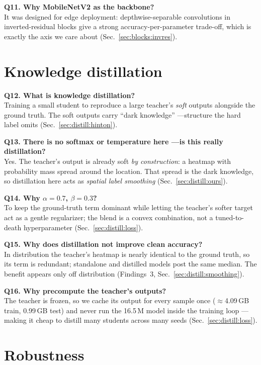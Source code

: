 \textbf{Q11. Why MobileNetV2 as the backbone?}\\
It was designed for edge deployment: depthwise-separable convolutions in inverted-residual blocks give
a strong accuracy-per-parameter trade-off, which is exactly the axis we care about
(Sec.~\ref{sec:blocks:invres}).

\section{Knowledge distillation}
\label{sec:qa:kd}

\textbf{Q12. What is knowledge distillation?}\\
Training a small student to reproduce a large teacher's \emph{soft} outputs alongside the ground truth.
The soft outputs carry ``dark knowledge'' ---structure the hard label omits (Sec.~\ref{sec:distill:hinton}).

\textbf{Q13. There is no softmax or temperature here ---is this really distillation?}\\
Yes. The teacher's output is already soft \emph{by construction}: a heatmap with probability mass
spread around the location. That spread is the dark knowledge, so distillation here acts as
\emph{spatial label smoothing} (Sec.~\ref{sec:distill:ours}).

\textbf{Q14. Why $\alpha=0.7$, $\beta=0.3$?}\\
To keep the ground-truth term dominant while letting the teacher's softer target act as a gentle
regularizer; the blend is a convex combination, not a tuned-to-death hyperparameter
(Sec.~\ref{sec:distill:loss}).

\textbf{Q15. Why does distillation not improve clean accuracy?}\\
In distribution the teacher's heatmap is nearly identical to the ground truth, so its term is
redundant; standalone and distilled models post the same median. The benefit appears only off
distribution (Findings~3, Sec.~\ref{sec:distill:smoothing}).

\textbf{Q16. Why precompute the teacher's outputs?}\\
The teacher is frozen, so we cache its output for every sample once ($\approx$4.09\,GB train,
0.99\,GB test) and never run the 16.5\,M model inside the training loop ---making it cheap to distill
many students across many seeds (Sec.~\ref{sec:distill:loss}).

\section{Robustness}
\label{sec:qa:robust}

